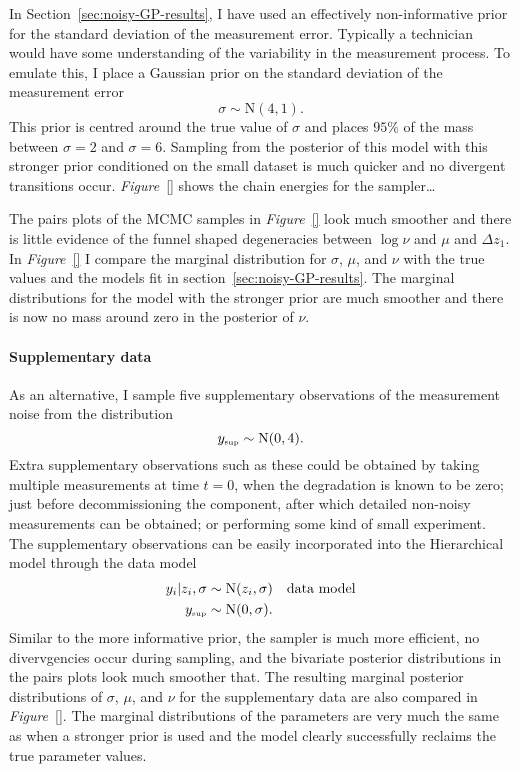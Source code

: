 In Section~\ref{sec:noisy-GP-results}, I have used an effectively non-informative prior for the standard deviation of the measurement error. Typically a technician would have some understanding of the variability in the measurement process. To emulate this, I place a Gaussian prior on the standard deviation of the measurement error
\begin{equation*}
  \sigma \sim \mbox{N}(4, 1).
\end{equation*}
This prior is centred around the true value of $\sigma$ and places $95\%$ of the mass between $\sigma = 2$ and $\sigma = 6$. Sampling from the posterior of this model with this stronger prior conditioned on the small dataset is much quicker and no divergent transitions occur. \textit{Figure}~\ref{} shows the chain energies for the sampler\ldots

The pairs plots of the MCMC samples in \textit{Figure}~\ref{} look much smoother and there is little evidence of the funnel shaped degeneracies between $\log{\nu}$ and $\mu$ and $\Delta z_1$. In \textit{Figure}~\ref{} I compare the marginal distribution for $\sigma$, $\mu$, and $\nu$ with the true values and the models fit in section~\ref{sec:noisy-GP-results}. The marginal distributions for the model with the stronger prior are much smoother and there is now no mass around zero in the posterior of $\nu$.

\paragraph*{Supplementary data}

As an alternative, I sample five supplementary observations of the measurement noise from the distribution
\begin{equation*}
  y_{\text{\tiny{sup}}} \sim \mbox{N}(0, 4).
\end{equation*}
Extra supplementary observations such as these could be obtained by taking multiple measurements at time $t = 0$, when the degradation is known to be zero; just before decommissioning the component, after which detailed non-noisy measurements can be obtained; or performing some kind of small experiment. The supplementary observations can be easily incorporated into the Hierarchical model through the data model
\begin{align*}
  y_i|z_i, \sigma & \sim \mbox{N}(z_i, \sigma)  && \mbox{data model} \\
  y_{\text{\tiny{sup}}} & \sim \mbox{N}(0, \sigma).
\end{align*}
Similar to the more informative prior, the sampler is much more efficient, no divervgencies occur during sampling, and the bivariate posterior distributions in the pairs plots look much smoother that. The resulting marginal posterior distributions of $\sigma$, $\mu$, and $\nu$ for the supplementary data are also compared in \textit{Figure}~\ref{}. The marginal distributions of the parameters are very much the same as when a stronger prior is used and the model clearly successfully reclaims the true parameter values.

